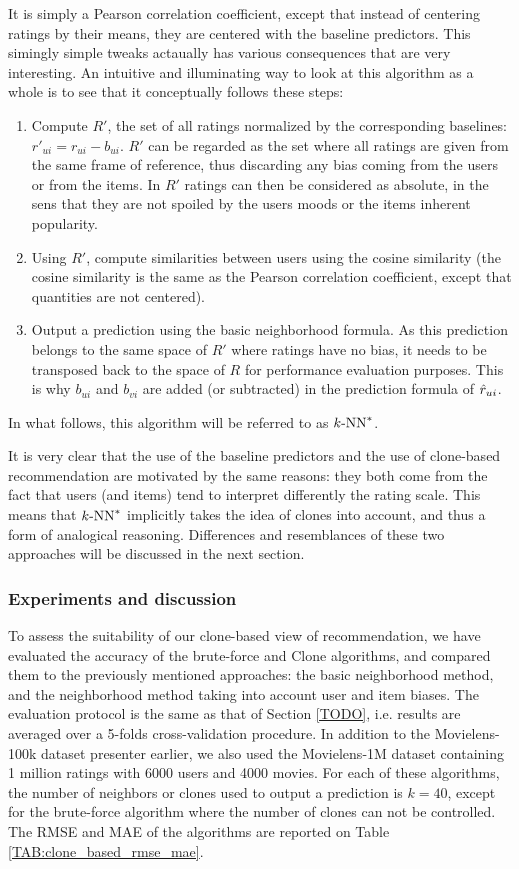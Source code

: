 It is simply a Pearson correlation coefficient, except that instead of
centering ratings by their means, they are centered with the baseline
predictors. This simingly simple tweaks actaually has various consequences that
are very interesting. An intuitive and illuminating way to look at this
algorithm as a whole is to see that it conceptually follows these steps:
\begin{enumerate}
  \item Compute $R'$, the set of all ratings normalized by the corresponding
    baselines: $r'_{ui} = r_{ui} - b_{ui}$.  $R'$ can be regarded as the set
    where all ratings are given from the same frame of reference, thus
    discarding any bias coming from the users or from the items. In $R'$
    ratings can then be considered as absolute, in the sens that they are not
    spoiled by the users moods or the items inherent popularity.
  \item Using $R'$, compute similarities between users using the cosine
    similarity (the cosine similarity is the same as the Pearson correlation
    coefficient, except that quantities are not centered).
  \item Output a prediction using the basic neighborhood formula. As this
    prediction belongs to the same space of $R'$ where ratings have no bias, it
    needs to be transposed back to the space of $R$ for performance evaluation
    purposes. This is why $b_{ui}$ and $b_{vi}$ are added (or subtracted) in
    the prediction formula of $\hat{r}_{ui}$.
\end{enumerate}
\noindent
In what follows, this algorithm will be referred to as $k\text{-NN}^*$.

It is very clear that the use of the baseline predictors and the use of
clone-based recommendation are motivated by the same reasons: they both come
from the fact that users (and items) tend to interpret differently the rating
scale.  This means that $k\text{-NN}^*$ implicitly takes the idea of clones into
account, and thus a form of analogical reasoning.  Differences and resemblances
of these two approaches will be discussed in the next section.

\subsubsection{Experiments and discussion}
\label{expeDiscuss}

To assess the suitability of our clone-based view of recommendation, we have
evaluated the accuracy of the brute-force and Clone algorithms, and compared
them to the previously mentioned approaches: the basic neighborhood method, and
the neighborhood method taking into account user and item biases. The
evaluation protocol is the same as that of Section \ref{TODO}, i.e. results are
averaged over a 5-folds cross-validation procedure. In addition to
the Movielens-100k dataset presenter earlier, we also used the Movielens-1M
dataset containing 1 million ratings with 6000 users and 4000 movies.
For each of these algorithms, the number of neighbors or clones used to output
a prediction is $k = 40$, except for the brute-force algorithm where the number
of clones can not be controlled. The RMSE and MAE of the algorithms are
reported on Table
\ref{TAB:clone_based_rmse_mae}.

